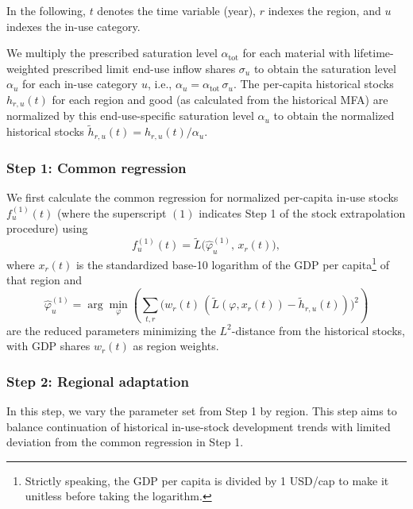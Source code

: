 In the following, $t$ denotes the time variable (year), $r$ indexes the region, and $u$ indexes the in-use category.

We multiply the prescribed saturation level $\alpha_\text{tot}$ for each material with lifetime-weighted prescribed limit end-use inflow shares $\sigma_u$ to obtain the saturation level $\alpha_u$ for each in-use category $u$, i.e., $\alpha_u = \alpha_\text{tot} \, \sigma_u$.
The per-capita historical stocks $h_{r,u}(t)$ for each region and good (as calculated from the historical MFA) are normalized by this end-use-specific saturation level $\alpha_u$ to obtain the normalized historical stocks $\tilde{h}_{r,u}(t) = h_{r,u}(t)/\alpha_u$.

\subsubsection{Step 1: Common regression}

We first calculate the common regression for normalized per-capita in-use stocks $f^{(1)}_u(t)$ (where the superscript $(1)$ indicates Step 1 of the stock extrapolation procedure) using
\begin{equation}
f^{(1)}_u(t) = \tilde{L}\big(\hat{\varphi}^{(1)}_u,\,x_r(t)\big),
\end{equation}
where $x_r(t)$ is the standardized base-10 logarithm of the GDP per capita\footnote{Strictly speaking, the GDP per capita is divided by 1 USD/cap to make it unitless before taking the logarithm.} of that region and
\begin{equation}
    \hat{\varphi}^{(1)}_u = \arg\min_{\varphi} \left( \sum_{t,r} \big(w_r(t)\,(\tilde{L}(\varphi,x_r(t))-\tilde{h}_{r,u}(t))\big)^2 \right)
\end{equation}
are the reduced parameters minimizing the $L^2$-distance from the historical stocks, with GDP shares $w_r(t)$ as region weights.


\subsubsection{Step 2: Regional adaptation}

In this step, we vary the parameter set from Step 1 by region. This step aims to balance continuation of historical in-use-stock development trends with limited deviation from the common regression in Step 1.

